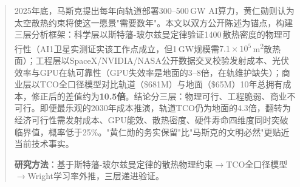 
\begin{abstract}
\noindent 2025年底，马斯克提出每年向轨道部署300--500\,GW AI算力，黄仁勋则认为太空散热约束将使这一愿景"需要数年"。本文以双方公开陈述为锚点，构建三层分析框架：科学层以斯特藩-玻尔兹曼定律验证1400\,\unitWpm{}散热密度的物理可行性（AI1卫星实测证实该工作点成立，但1\,GW规模需$7.1 \times 10^5$\,m\textsuperscript{2}散热面）；工程层以SpaceX/NVIDIA/NASA公开数据交叉校验发射成本、光伏效率与GPU在轨可靠性（GPU失效率是地面的3--8倍，在轨维护缺失）；商业层以TCO全口径模型对比轨道（\$681M）与地面（\$65M）10年总拥有成本，修正后的差值约为\textbf{10.5倍}。结论分三层：物理可行、工程脆弱、商业不可行。即便最乐观的2030年成本推演，轨道TCO仍为地面的4.3倍，翻转为经济可行性需发射成本、GPU能效、散热密度、硬件寿命四维度同时突破临界值，概率低于25\%。"黄仁勋的务实保留"比"马斯克的文明必然"更贴近当前技术事实。

\vspace{1em}
\textbf{研究方法}：基于斯特藩-玻尔兹曼定律的散热物理约束$\rightarrow$TCO全口径模型$\rightarrow$Wright学习率外推，三层递进验证。
\end{abstract}
